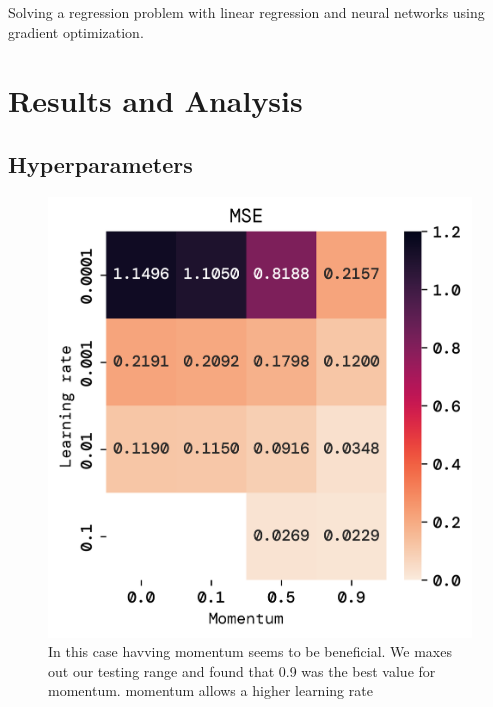 \documentclass[twoside,11pt]{report}
\begin{document}
    Solving a regression problem with linear regression and neural networks using gradient optimization.



\section*{Results and Analysis}
\label{sec:resultsdiscussion2}




\subsection*{Hyperparameters}
\label{sec:hyperparameters2}


    \begin{figure}[!ht]
        \begin{minipage}[t]{0.5\textwidth - 1mm}
            \begin{center}
                \includegraphics[width=\textwidth]{../runsAndFigures/MSE_lr_gamma.png}
            \end{center}
            \caption{In this case havving momentum seems to be beneficial. We maxes out our testing range and found that 0.9 was the best value for momentum. momentum allows a higher learning rate}\label{fig:MSE_lr_gamma}

\end{minipage}
\end{figure}
\end{document}
